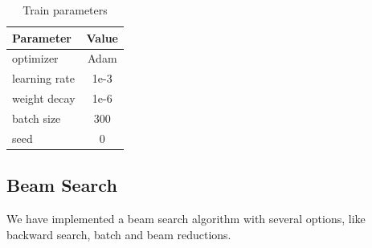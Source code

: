 \documentclass{article}
\begin{document}
\begin{table}[H] \label{tbl:rnn_training_parameters}
\begin{center}
\begin{tabular}[t]{|l|c|}
\hline
 Parameter & Value \\
\hline
optimizer  & Adam \\
learning rate & 1e-3\\
weight decay  & 1e-6 \\
batch size & 300 \\
seed & 0 \\
\hline
\end{tabular}
\caption{Train parameters}
\label{tab:statistics}
\end{center}
\end{table}

\subsection{Beam Search}
We have implemented a beam search algorithm with several options, like backward search, batch and beam reductions.
\end{document}

